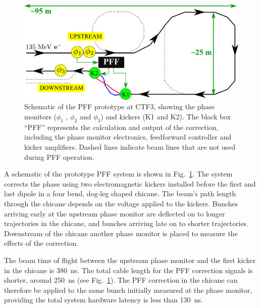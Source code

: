 \documentclass[%
 reprint,
superscriptaddress,
 amsmath,amssymb,
 prl,
]{revtex4-1}
\begin{document}
\begin{figure}
	\includegraphics[width=\columnwidth]{figs/ctfpffLayout}%
	\caption{\label{fig:pffLayout}Schematic of the PFF prototype at CTF3, 
	showing the phase monitors (\(\phi_1\) , 
	\(\phi_2\) and \(\phi_3\)) and
		 kickers (K1 and K2). The black box “PFF” represents the calculation 
		and output of the correction, including the phase monitor
		electronics, feedforward controller and kicker amplifiers.
		Dashed lines indicate beam lines that are not used during PFF 
		operation. 
		}
\end{figure}

A schematic of the prototype PFF system is shown in Fig.~\ref{fig:pffLayout}. 
The system corrects the phase using two electromagnetic kickers installed 
before the first and last dipole in a four bend, dog-leg shaped chicane. The 
beam's path length through the chicane depends on the voltage applied to the 
kickers. Bunches arriving early at the upstream 
phase monitor are deflected on to longer trajectories 
in the chicane, and bunches arriving late on to shorter trajectories. 
Downstream of the chicane another phase monitor is placed to measure the 
effects of the correction.

The beam time of flight between the upstream phase monitor and the first kicker 
in the chicane is 380~ns. The total cable length for the PFF correction signals 
is shorter, around 250~ns (see Fig.~\ref{fig:pffLayout}). The PFF correction in 
the chicane can therefore be applied to the same bunch initially measured at 
the phase monitor, providing the total system hardware latency is less than 
130~ns. 
\end{document}
